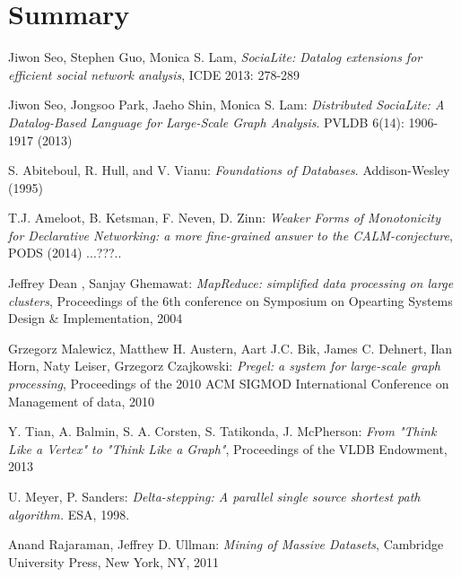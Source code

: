\documentclass{pracamgr}
\theoremstyle{plain}
\theoremstyle{definition}
\theoremstyle{remark}
\begin{document}
\chapter{Summary}\label{r:summary}


\begin{thebibliography}{99}


 Jiwon Seo, Stephen Guo, Monica S. Lam, \textit{SociaLite: Datalog extensions for efficient social network analysis}, ICDE 2013: 278-289

 Jiwon Seo, Jongsoo Park, Jaeho Shin, Monica S. Lam: \textit{Distributed SociaLite: A Datalog-Based Language for Large-Scale Graph Analysis}. PVLDB 6(14): 1906-1917 (2013)

 S. Abiteboul, R. Hull, and V. Vianu: \textit{Foundations of Databases}. Addison-Wesley (1995)

 T.J. Ameloot, B. Ketsman, F. Neven, D. Zinn: \textit{Weaker Forms of Monotonicity for Declarative Networking: a more fine-grained answer to the CALM-conjecture}, PODS (2014) ...???..

 Jeffrey Dean , Sanjay Ghemawat: \textit{MapReduce: simplified data processing on large clusters}, Proceedings of the 6th conference on Symposium on Opearting Systems Design \& Implementation, 2004

 Grzegorz Malewicz, Matthew H. Austern, Aart J.C. Bik, James C. Dehnert, Ilan Horn, Naty Leiser, Grzegorz Czajkowski: \textit{Pregel: a system for large-scale graph processing}, Proceedings of the 2010 ACM SIGMOD International Conference on Management of data, 2010

 Y. Tian, A. Balmin, S. A. Corsten, S. Tatikonda, J. McPherson: \textit{From "Think Like a Vertex" to "Think Like a Graph"}, Proceedings of the VLDB Endowment, 2013

 U. Meyer, P. Sanders: \textit{Delta-stepping: A parallel
single source shortest path algorithm.} ESA, 1998.

 Anand Rajaraman, Jeffrey D. Ullman: \textit{Mining of Massive Datasets}, Cambridge University Press, New York, NY, 2011

\begin{comment}
\bibitem[Fif00]{ffgg} Filigran Fifak, Gizbert Gryzogrzechotalski,
  \textit{O blabalii fetorycznej}, Materiały Konferencji Euroblabal
  2000.

\bibitem[Fif01]{ff-sr} Filigran Fifak, \textit{O fetorach
    $\sigma$-$\rho$}, Acta Fetorica, 2001.


\end{comment}
\end{thebibliography}
\end{document}
